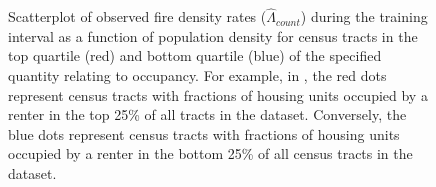 \documentclass{svjour3}
\begin{document}
  \begin{figure}[!htb]
       \begin{center}
      \end{center}
      \caption{Scatterplot of observed fire density rates ($\hat\Lambda_{count}$) during the training interval as a function of population density for census tracts in the top quartile (red) and bottom quartile (blue) of the specified quantity relating to occupancy. For example, in \protect{}, the red dots represent census tracts with fractions of housing units occupied by a renter in the top 25\% of all tracts in the dataset. Conversely, the blue dots represent census tracts with fractions of housing units occupied by a renter in the bottom 25\% of all census tracts in the dataset.}
     \label{fig:sep_example}
  \end{figure}
  
\end{document}
